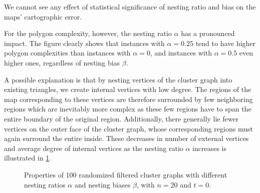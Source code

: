 We cannot see any effect of statistical significance of nesting ratio and bias on the maps' cartographic error.

For the polygon complexity, however, the nesting ratio $\alpha$ has a pronounced impact.
The figure clearly shows that instances with $\alpha = 0.25$ tend to have higher polygon complexities than instances with $\alpha = 0$, and instances with $\alpha = 0.5$ even higher ones, regardless of nesting bias $\beta$.

A possible explanation is that by nesting vertices of the cluster graph into existing triangles, we create internal vertices with low degree.
The regions of the map corresponding to these vertices are therefore surrounded by few neighboring regions which are inevitably more complex as these few regions have to span the entire boundary of the original region.
Additionally, there generally lie fewer vertices on the outer face of the cluster graph, whose corresponding regions must again surround the entire inside.
These decreases in number of external vertices and average degree of internal vertices as the nesting ratio $\alpha$ increases is illustrated in \cref{fig:experimental-evaluation-variable-nesting-ratio-and-bias-2}.

\begin{figure}[H]
	\centering
	\quad
	\caption{Properties of 100 randomized filtered cluster graphs  with different nesting ratios $\alpha$ and nesting biases $\beta$, with $n = 20$ and $t = 0$.}
	\label{fig:experimental-evaluation-variable-nesting-ratio-and-bias-2}
\end{figure}


